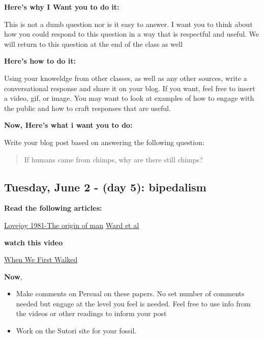 \documentclass[]{tufte-handout}
\begin{document}
\begin{marginfigure}
\textbf{Here's why I Want you to do it:}

This is not a dumb question nor is it easy to answer. I want you to
think about how you could respond to this question in a way that is
respectful and useful. We will return to this question at the end of the
class as well

\textbf{Here's how to do it:}

Using your knoweldge from other classes, as well as any other sources,
write a conversational response and share it on your blog. If you want,
feel free to insert a video, gif, or image. You may want to look at
examples of how to engage with the public and how to craft responses
that are useful.
\end{marginfigure}

\textbf{Now, Here's what i want you to do:}

Write your blog post based on answering the following question:

\begin{quote}
If humans came from chimps, why are there still chimps?
\end{quote}

\hypertarget{tuesday-june-2---day-5-bipedalism}{%
\subsection{Tuesday, June 2 - (day 5):
bipedalism}\label{tuesday-june-2---day-5-bipedalism}}

\textbf{Read the following articles:}

\href{https://www.researchgate.net/publication/6092674_The_Origin_of_Man}{Lovejoy
1981-The origin of man}
\href{https://www.ncbi.nlm.nih.gov/pubmed/31537304}{Ward et al}

\textbf{watch this video}

\href{https://www.youtube.com/watch?v=3bFtotU0of4}{When We First Walked}

\textbf{Now},

\begin{itemize}
\item
  Make comments on Persual on these papers. No set number of comments
  needed but engage at the level you feel is needed. Feel free to use
  info from the videos or other readings to inform your post
\item
  Work on the Sutori site for your fossil.
\end{itemize}
\end{document}
